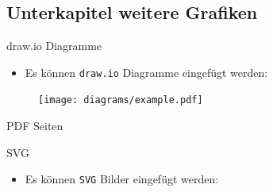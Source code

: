 \documentclass[aspectratio=169]{beamer}
\begin{document}
\subsection{Unterkapitel weitere Grafiken}

\begin{frame}{draw.io Diagramme}
    \begin{itemize}
        \item Es können \lstinline|draw.io| Diagramme eingefügt werden:
    \end{itemize}

    {
        \begin{figure}[H]
            \centering
            \texttt{[image: diagrams/example.pdf]}
        \end{figure}
    }
\end{frame}

\begin{frame}{PDF Seiten}
    \begin{figure}[H]
        \centering
    \end{figure}
\end{frame}

\begin{frame}{SVG}
    \begin{itemize}
        \item Es können \lstinline|SVG| Bilder eingefügt werden:
    \end{itemize}

    {
        \begin{figure}
            
        \end{figure}
    }
\end{frame}
\end{document}
